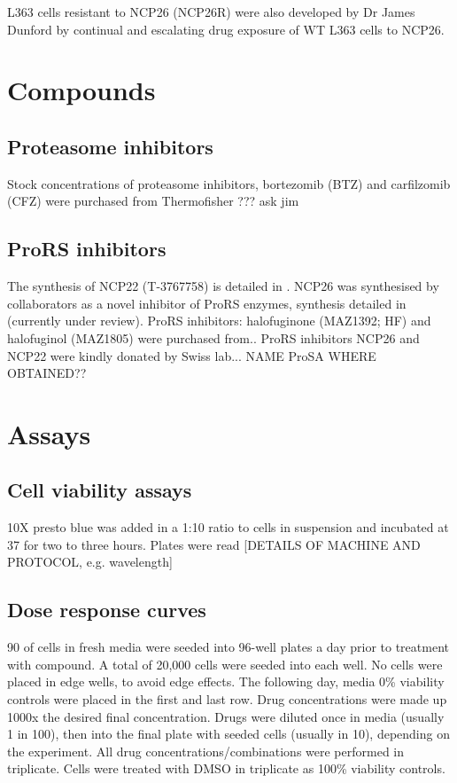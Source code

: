 L363 cells resistant to NCP26 (NCP26R) were also developed by Dr James Dunford by continual and escalating drug exposure of WT L363 cells to NCP26.

\section{Compounds}

\subsection{Proteasome inhibitors}
Stock concentrations of proteasome inhibitors, bortezomib (BTZ) and carfilzomib (CFZ) were purchased from Thermofisher ??? ask jim

\subsection{ProRS inhibitors}
The synthesis of NCP22 (T-3767758) is detailed in \cite{adachi2017discovery}.
NCP26 was synthesised by collaborators as a novel inhibitor of ProRS enzymes, synthesis detailed in \cite{tyediscovery2021} (currently under review).
ProRS inhibitors: halofuginone (MAZ1392; HF) and halofuginol (MAZ1805) were purchased from..
ProRS inhibitors NCP26 and NCP22 were kindly donated by Swiss lab... NAME
ProSA
WHERE OBTAINED??


\section{Assays}
\subsection{Cell viability assays}
10X presto blue was added in a 1:10 ratio to cells in suspension and incubated at 37\C{} for two to three hours.
Plates were read [DETAILS OF MACHINE AND PROTOCOL, e.g. wavelength]

\subsection{Dose response curves}\label{subsec:method_doseresponse}
90\ul{} of cells in fresh media were seeded into 96-well plates a day prior to treatment with compound.
A total of 20,000 cells were seeded into each well.
No cells were placed in edge wells, to avoid edge effects.
The following day, media 0\% viability controls were placed in the first and last row.
Drug concentrations were made up 1000x the desired final concentration.
Drugs were diluted once in media (usually 1 in 100), then into the final plate with seeded cells (usually in 10), depending on the experiment.
All drug concentrations/combinations were performed in triplicate.
Cells were treated with DMSO in triplicate as 100\% viability controls.

